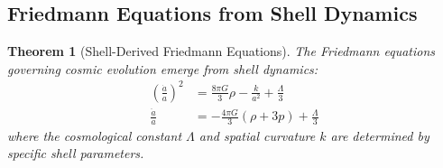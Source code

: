 \documentclass[12pt,a4paper]{article}
\newtheorem{theorem}{Theorem}[section]
\begin{document}
\subsection{Friedmann Equations from Shell Dynamics}
\label{subsec:friedmann-equations}

\begin{theorem}[Shell-Derived Friedmann Equations]
\label{thm:friedmann-equations}
The Friedmann equations governing cosmic evolution emerge from shell dynamics:
\begin{align}
\left(\frac{\dot{a}}{a}\right)^2 &= \frac{8\pi G}{3}\rho - \frac{k}{a^2} + \frac{\Lambda}{3} \\
\frac{\ddot{a}}{a} &= -\frac{4\pi G}{3}(\rho + 3p) + \frac{\Lambda}{3}
\end{align}
where the cosmological constant $\Lambda$ and spatial curvature $k$ are determined by specific shell parameters.
\end{theorem}
\end{document}
